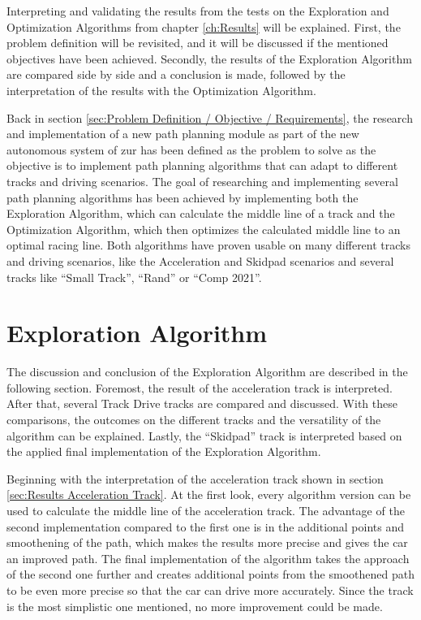 Interpreting and validating the results from the tests on the Exploration and Optimization Algorithms from chapter \ref{ch:Results} will be explained. First, the problem definition will be revisited, and it will be discussed if the mentioned objectives have been achieved. Secondly, the results of the Exploration Algorithm are compared side by side and a conclusion is made, followed by the interpretation of the results with the Optimization Algorithm.

Back in section \ref{sec:Problem Definition / Objective / Requirements}, the research and implementation of a new path planning module as part of the new autonomous system of \acrlong{zur} has been defined as the problem to solve as the objective is to implement path planning algorithms that can adapt to different tracks and driving scenarios. The goal of researching and implementing several path planning algorithms has been achieved by implementing both the Exploration Algorithm, which can calculate the middle line of a track and the Optimization Algorithm, which then optimizes the calculated middle line to an optimal racing line. Both algorithms have proven usable on many different tracks and driving scenarios, like the Acceleration and Skidpad scenarios and several tracks like ``Small Track'', ``Rand'' or ``Comp 2021''.

\section{Exploration Algorithm}
The discussion and conclusion of the Exploration Algorithm are described in the following section. Foremost, the result of the acceleration track is interpreted. After that, several Track Drive tracks are compared and discussed. With these comparisons, the outcomes on the different tracks and the versatility of the algorithm can be explained. Lastly, the ``Skidpad'' track is interpreted based on the applied final implementation of the Exploration Algorithm.

Beginning with the interpretation of the acceleration track shown in section \ref{sec:Results Acceleration Track}. At the first look, every algorithm version can be used to calculate the middle line of the acceleration track. The advantage of the second implementation compared to the first one is in the additional points and smoothening of the path, which makes the results more precise and gives the car an improved path. The final implementation of the algorithm takes the approach of the second one further and creates additional points from the smoothened path to be even more precise so that the car can drive more accurately. Since the track is the most simplistic one mentioned, no more improvement could be made.

